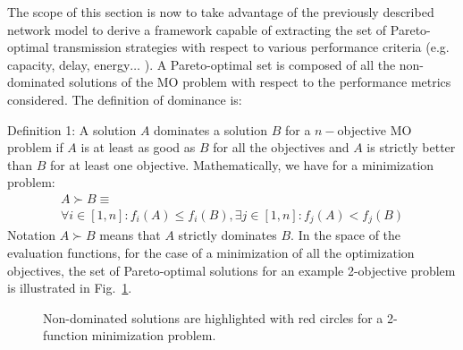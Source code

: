 \documentclass[a4paper]{article}
\begin{document}
The scope of this section is now to take advantage of the previously described network model to derive a framework capable of extracting the set of Pareto-optimal transmission strategies with respect to various performance criteria (e.g. capacity, delay, energy$\dots$ ).
A Pareto-optimal set is composed of all the non-dominated solutions of the MO problem with respect to the performance metrics considered. The definition of dominance is:

{\sc Definition 1:} A solution $A$ dominates a solution $B$ for a $n-$objective MO problem if $A$ is at least as good as $B$ for all the objectives and $A$ is strictly better than $B$ for at least one objective. Mathematically, we have for a minimization problem:
\begin{equation}
\label{eq:dominance}
\begin{split}
A \succ B \equiv  \\ \forall i \in [1,n] : f_i(A)\leq f_i(B), \exists j \in [1,n] : f_j(A) < f_j(B)
\end{split}
\end{equation}
\noindent Notation $A \succ B$ means that $A$ strictly dominates $B$.
In the space of the evaluation functions, for the case of a minimization of all the optimization objectives, the set of Pareto-optimal solutions for an example 2-objective problem is illustrated in Fig.~\ref{fig:dominance}.

\begin{figure}
\begin{center}
\caption{Non-dominated solutions are highlighted with red circles for a 2-function minimization problem.}
\label{fig:dominance}
\end{center}
\end{figure}
\end{document}
